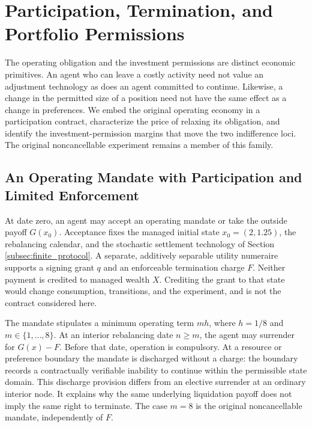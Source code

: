 \section{Participation, Termination, and Portfolio Permissions}
\label{sec:r9_contract}
The operating obligation and the investment permissions are distinct economic primitives. An agent who can leave a costly activity need not value an adjustment technology as does an agent committed to continue. Likewise, a change in the permitted size of a position need not have the same effect as a change in preferences. We embed the original operating economy in a participation contract, characterize the price of relaxing its obligation, and identify the investment-permission margins that move the two indifference loci. The original noncancellable experiment remains a member of this family.

\subsection{An Operating Mandate with Participation and Limited Enforcement}
\label{subsec:r9_participation}
At date zero, an agent may accept an operating mandate or take the outside payoff $G(x_0)$. Acceptance fixes the managed initial state $x_0=(2,1.25)$, the rebalancing calendar, and the stochastic settlement technology of Section \ref{subsec:finite_protocol}. A separate, additively separable utility numeraire supports a signing grant $q$ and an enforceable termination charge $F$. Neither payment is credited to managed wealth $X$. Crediting the grant to that state would change consumption, transitions, and the experiment, and is not the contract considered here.

The mandate stipulates a minimum operating term $m h$, where $h=1/8$ and $m\in\{1,\ldots,8\}$. At an interior rebalancing date $n\geq m$, the agent may surrender for $G(x)-F$. Before that date, operation is compulsory. At a resource or preference boundary the mandate is discharged without a charge: the boundary records a contractually verifiable inability to continue within the permissible state domain. This discharge provision differs from an elective surrender at an ordinary interior node. It explains why the same underlying liquidation payoff does not imply the same right to terminate. The case $m=8$ is the original noncancellable mandate, independently of $F$.

